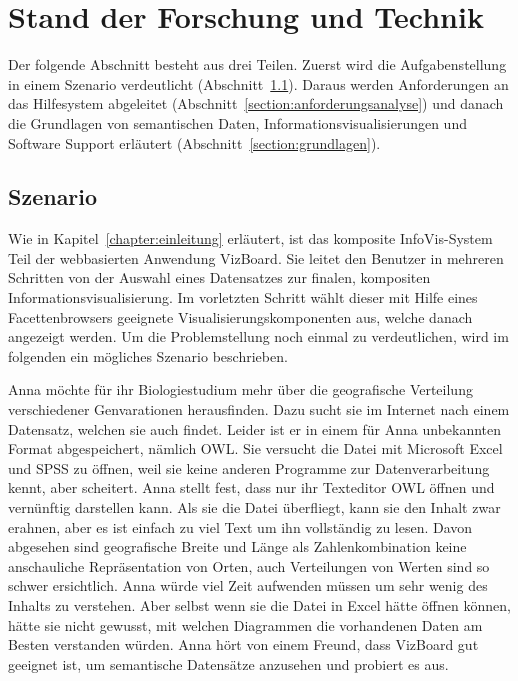 \documentclass[
	headsepline,
	footsepline,
	fontsize=12pt,
	bibliography=totoc
]{scrbook}
\begin{document}

\chapter{Stand der Forschung und Technik}
\label{chapter:standderforschung}

Der folgende Abschnitt besteht aus drei Teilen. Zuerst wird die Aufgabenstellung in einem Szenario verdeutlicht (Abschnitt~\ref{section:szenario}). Daraus werden Anforderungen an das Hilfesystem abgeleitet (Abschnitt~\ref{section:anforderungsanalyse}) und danach die Grundlagen von semantischen Daten, Informationsvisualisierungen und Software Support erläutert (Abschnitt~\ref{section:grundlagen}).

\section{Szenario}
\label{section:szenario}


Wie in Kapitel~\ref{chapter:einleitung} erläutert, ist das komposite InfoVis-System Teil der webbasierten Anwendung VizBoard. Sie leitet den Benutzer in mehreren Schritten von der Auswahl eines Datensatzes zur finalen, kompositen Informationsvisualisierung. Im vorletzten Schritt wählt dieser mit Hilfe eines Facettenbrowsers geeignete Visualisierungskomponenten aus, welche danach angezeigt werden. Um die Problemstellung noch einmal zu verdeutlichen, wird im folgenden ein mögliches Szenario beschrieben.

Anna möchte für ihr Biologiestudium mehr über die geografische Verteilung verschiedener Genvarationen herausfinden. Dazu sucht sie im Internet nach einem Datensatz, welchen sie auch findet. 
Leider ist er in einem für Anna unbekannten Format abgespeichert, nämlich OWL. Sie versucht die Datei mit Microsoft Excel und SPSS zu öffnen, weil sie keine anderen Programme zur Datenverarbeitung kennt, aber scheitert. Anna stellt fest, dass nur ihr Texteditor OWL öffnen und vernünftig darstellen kann. Als sie die Datei überfliegt, kann sie den Inhalt zwar erahnen, aber es ist einfach zu viel Text um ihn vollständig zu lesen. Davon abgesehen sind geografische Breite und Länge als Zahlenkombination keine anschauliche Repräsentation von Orten, auch Verteilungen von Werten sind so schwer ersichtlich. Anna würde viel Zeit aufwenden müssen um sehr wenig des Inhalts zu verstehen. Aber selbst wenn sie die Datei in Excel hätte öffnen können, hätte sie nicht gewusst, mit welchen Diagrammen die vorhandenen Daten am Besten verstanden würden. Anna hört von einem Freund, dass VizBoard gut geeignet ist, um semantische Datensätze anzusehen und probiert es aus.
\end{document}
